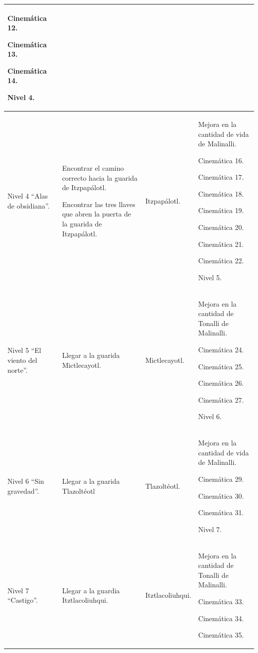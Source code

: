 \begin{longtable}[c]{ | m{3.75cm} | m{3.75cm}| m{3.75cm} | m{3.75cm}|}
			Cinemática 12.
			\par
			Cinemática 13.
			\par 
			Cinemática 14.
			\par
			Nivel 4.		 
		 \\ 
		\hline
		Nivel 4 “Alas de obsidiana”. & 
			Encontrar el camino correcto hacia la guarida de Itzpapálotl.
			\par
			Encontrar las tres llaves que abren la puerta de la guarida de Itzpapálotl.&
		Itzpapálotl. &
			 Mejora en la cantidad de vida de Malinalli.
			 \par
			 Cinemática 16.
			 \par
			 Cinemática 17.
			 \par
			 Cinemática 18.
			 \par
			 Cinemática 19.
			 \par
			 Cinemática 20.
			 \par
			 Cinemática 21.
			 \par
			 Cinemática 22.
			 \par
			 Nivel 5.		 
		 \\ 
		\hline
		Nivel 5 “El viento del norte”. & 
		Llegar a la guarida Mictlecayotl.&
		Mictlecayotl. &
		Mejora en la cantidad de Tonalli de Malinalli.
		\par
		Cinemática 24.
		\par
		Cinemática 25.
		\par
		Cinemática 26.
		\par
		Cinemática 27.
		\par
		Nivel 6.		 
		 \\ 
		\hline
		Nivel 6 “Sin gravedad”. & 
		Llegar a la guarida Tlazoltéotl &
		Tlazoltéotl. &
		Mejora en la cantidad de vida de Malinalli.
		\par
		Cinemática 29.
		\par
		Cinemática 30.
		\par
		Cinemática 31.
		\par
		 Nivel 7.		 
		 \\ 
		\hline
		Nivel 7 “Castigo”. & 
		Llegar a la guardia Itztlacoliuhqui. &
		Itztlacoliuhqui. &
		Mejora en la cantidad de Tonalli de Malinalli.
		\par
		Cinemática 33.
		\par
		Cinemática 34.
		\par
		Cinemática 35.
		\par

\end{longtable}
